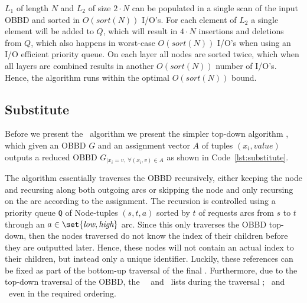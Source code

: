 $L_1$ of length $N$ and $L_2$ of size $2 \cdot N$ can be populated in a single
scan of the input OBBD and sorted in $O(sort(N))$ I/O's. For each element of
$L_2$ a single element will be added to $Q$, which will result in $4 \cdot N$
insertions and deletions from $Q$, which also happens in worst-case $O(sort(N))$
I/O's when using an I/O efficient priority queue. On each layer all nodes are
sorted twice, which when all layers are combined results in another $O(sort(N))$
number of I/O's. Hence, the algorithm runs within the optimal $O(sort(N))$
bound. \cite{Arge96}

\subsection{Substitute} \label{sec:theory_substitute}
Before we present the \Apply\ algorithm we present the simpler top-down
algorithm \Substitute, which given an OBBD $G$ and an assignment vector $A$ of
tuples $(x_i, \mathit{value})$ outputs a reduced OBBD $G_{| x_i = v ,\ \forall
  (x_i,v) \in A}$ as shown in Code~\ref{lst:substitute}.

The algorithm essentially traverses the OBBD recursively, either keeping the
node and recursing along both outgoing arcs or skipping the node and only
recursing on the arc according to the assignment. The recursion is controlled
using a priority queue \lstinline{Q} of Node-tuples $(s,t,a)$ sorted by $t$ of
requests arcs from $s$ to $t$ through an $a \in \set{\textit{low},
  \textit{high}}$ arc. Since this only traverses the OBBD top-down, then the
nodes traversed do not know the index of their children before they are
outputted later. Hence, these nodes will not contain an actual index to their
children, but instead only a unique identifier. Luckily, these references can be
fixed as part of the bottom-up traversal of the final \Reduce. Furthermore, due
to the top-down traversal of the OBBD, the \ReduceL\, \ReduceLnode\ and
\ReduceLsink\ lists during the traversal \Reduce; \ReduceL\ and \ReduceLnode\
even in the required ordering.

